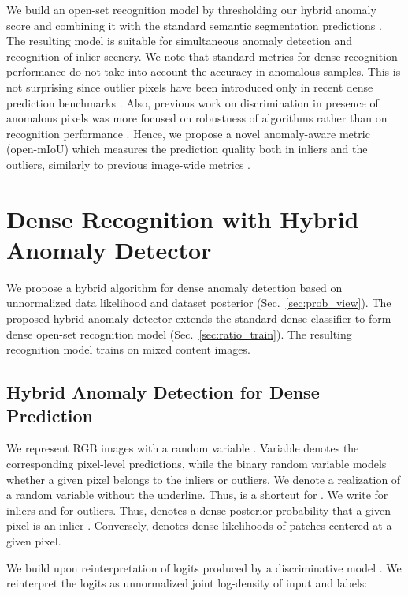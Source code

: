 \documentclass[runningheads]{llncs}
\begin{document}
We build an open-set recognition model by thresholding our hybrid anomaly score and combining it with the standard semantic segmentation predictions \cite{boult19aaai}.
The resulting model is suitable for simultaneous anomaly detection and recognition of inlier scenery.
We note that standard metrics for dense recognition performance \cite{everingham15ijcv} do not take into account the accuracy in anomalous samples.
This is not surprising since outlier pixels have been introduced only in recent dense prediction benchmarks \cite{zendel18eccv,blum21ijcv,chan21arxiv}.
Also, previous work on discrimination in presence of anomalous pixels was more focused on robustness of algorithms rather than on recognition performance \cite{zendel18eccv}.
Hence, we propose a novel anomaly-aware metric (open-mIoU) which measures the prediction quality both in inliers and the outliers, similarly to previous image-wide metrics \cite{sokolova09ipm,scherreik16taes}.

\section{Dense Recognition with Hybrid Anomaly Detector}

We propose a hybrid algorithm for dense anomaly detection based on unnormalized data likelihood and dataset posterior (Sec.\ \ref{sec:prob_view}).
The proposed hybrid anomaly detector extends the standard dense classifier to form dense open-set recognition model (Sec.\ \ref{sec:ratio_train}).
The resulting recognition model trains on mixed content images.




\subsection{Hybrid Anomaly Detection for Dense Prediction
\label{sec:prob_view}}

We represent RGB images with a random variable .
Variable  denotes the corresponding pixel-level predictions, while the binary random variable  models whether a given pixel belongs to the inliers or outliers. 
We denote a realization of a random variable without the underline.
Thus,  is a shortcut for .
We write  for inliers and  for outliers.
Thus,  denotes a dense posterior probability that a given pixel is an inlier \cite{hendrycks19iclr,bevandic19gcpr}.
Conversely,  denotes dense likelihoods of patches centered at a given pixel.

We build upon reinterpretation of logits  produced by a discriminative model  \cite{grathwohl20iclr}.
We reinterpret the logits as unnormalized joint log-density of input and labels:
\end{document}
